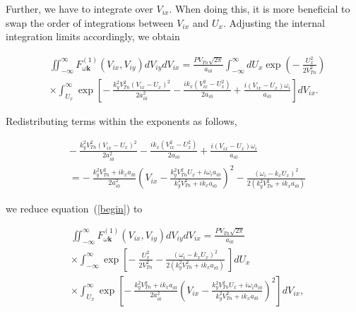 \documentclass[draft]{agujournal2019}
\renewcommand{\vec}{\mathbf}
\begin{document}
{Further, we have to integrate over $V_{ix}$. When doing this, it is more
beneficial to swap the order of integrations between $V_{ix}$ and
$U_{x}$. Adjusting the internal integration limits accordingly, we obtain
\begin{linenomath*}
\begin{align}
&  \iint_{-\infty}^{\infty}F_{\omega\vec{k}}^{(1)}(V_{ix},V_{iy}%
)dV_{iy}dV_{ix}=\frac{PV_{Tn}\sqrt{2\pi}}{a_{i0}}\int_{-\infty}^{\infty
}dU_{x}\exp\left(  -\ \frac{U_{x}^{2}}{2V_{Tn}^{2}}\right) \nonumber\\
&  \times\int_{U_{x}}^{\infty}\exp\left[  -\ \frac{k_{y}^{2}V_{Tn}^{2}\left(
V_{ix}-U_{x}\right)  ^{2}}{2a_{i0}^{2}}-\frac{ik_{x}\left(  V_{ix}^{2}%
-U_{x}^{2}\right)  }{2a_{i0}}+\frac{i\left(  V_{ix}-U_{x}\right)  \omega_{i}%
}{a_{i0}}\right]  dV_{ix}. 
\label{begin}
\end{align}
\end{linenomath*}
Redistributing terms within the exponents as follows,
\begin{linenomath*}
\begin{align*}
&  -\ \frac{k_{y}^{2}V_{Tn}^{2}\left(  V_{ix}-U_{x}\right)  ^{2}}{2a_{i0}^{2}%
}-\frac{ik_{x}\left(  V_{ix}^{2}-U_{x}^{2}\right)  }{2a_{i0}}+\frac{i\left(
V_{ix}-U_{x}\right)  \omega_{i}}{a_{i0}}\\
&  =-\ \frac{k_{y}^{2}V_{Tn}^{2}+ik_{x}a_{i0}}{2a_{i0}^{2}}\left(
V_{ix}-\frac{k_{y}^{2}V_{Tn}^{2}U_{x}+i\omega_{i}a_{i0}}{k_{y}^{2}V_{Tn}%
^{2}+ik_{x}a_{i0}}\right)  ^{2}-\frac{\left(  \omega_{i}-k_{x}U_{x}\right)
^{2}}{2\left(  k_{y}^{2}V_{Tn}^{2}+ik_{x}a_{i0}\right)  }
\end{align*}
\end{linenomath*}
we reduce equation~(\ref{begin}) to
\begin{linenomath*}
\begin{align}
&  \iint_{-\infty}^{\infty}F_{\omega\vec{k}}^{(1)}(V_{ix},V_{iy}%
)dV_{iy}dV_{ix}=\frac{PV_{Tn}\sqrt{2\pi}}{a_{i0}}\nonumber\\
&  \times\int_{-\infty}^{\infty}\exp\left[  -\ \frac{U_{x}^{2}}{2V_{Tn}^{2}%
}-\frac{\left( \omega_{i}-k_{x}U_{x}\right)  ^{2}}{2\left(  k_{y}^{2}V_{Tn}%
^{2}+ik_{x}a_{i0}\right)  }\ \right]  dU_{x}\nonumber\\
&  \times\int_{U_{x}}^{\infty}\exp\left[  -\ \frac{k_{y}^{2}V_{Tn}^{2}%
+ik_{x}a_{i0}}{2a_{i0}^{2}}\left(  V_{ix}-\frac{k_{y}^{2}V_{Tn}^{2}U_{x}%
+i\omega_{i}a_{i0}}{k_{y}^{2}V_{Tn}^{2}+ik_{x}a_{i0}}\right)  ^{2}\right]
dV_{ix}, 
\label{promezh}
\end{align}

\end{linenomath*}}
\end{document}
